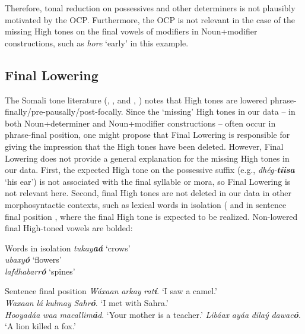 \documentclass[output=paper]{langscibook}
\begin{document}
Therefore, tonal reduction on possessives and other determiners is not plausibly motivated by the OCP. Furthermore, the OCP is not relevant in the case of the missing High tones on the final vowels of modifiers in Noun+modifier constructions, such as \textit{hore} ‘early’ in this example.

\subsection{Final Lowering}


The Somali tone literature (\citealt{Andrzejewski1981,Armstrong1934,Hyman1981}, \citealt{LeGac2003}, and \citealt{Saeed1993}, \citeyear{Saeed1999}) notes that High tones are lowered phrase-finally\slash pre-pausally\slash post-focally. Since the ‘missing’ High tones in our data – in both Noun+determiner and Noun+modifier constructions – often occur in phrase-final position, one might propose that Final Lowering is responsible for giving the impression that the High tones have been deleted. However, Final Lowering does not provide a general explanation for the missing High tones in our data. First, the expected High tone on the possessive suffix (e.g., \textit{dhég-}\textbf{\textit{tíisa}} ‘his ear’) is not associated with the final syllable or mora, so Final Lowering is not relevant here. Second, final High tones are not deleted in our data in other morphosyntactic contexts, such as lexical words in isolation ( and in sentence final position , where the final High tone is expected to be realized. Non-lowered final High-toned vowels are bolded:


\ea  Words in isolation  \label{ex:downing:10}
\ea  \textit{tukay}\textbf{\textit{aá}}  ‘crows’ \\
\ex   \textit{ubaxy}\textbf{\textit{ó}}  ‘flowers’ \\
\ex   \textit{lafdhabarr}\textbf{\textit{ó}}  ‘spines’\\
\z
\z

\ea  Sentence final position \label{ex:downing:11}
\ea  \textit{Wáxaan} \textit{arkay} \textit{rat}\textbf{\textit{í}}.  ‘I saw a camel.’ \\
\ex   \textit{Waxaan} \textit{lá} \textit{kulmay} \textit{Sahr}\textbf{\textit{ó}}.  ‘I met with Sahra.’\\
\ex \textit{Hooyadáa} \textit{waa} \textit{macallim}\textbf{\textit{á}}\textit{d}.  ‘Your mother is a teacher.’
\ex \textit{Libáax} \textit{ayáa} \textit{dilaý} \textit{dawac}\textbf{\textit{ó}}.  ‘A lion killed a fox.’
\z
\z
\end{document}
